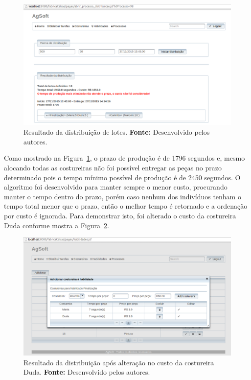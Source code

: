 \begin{figure}[h!]
	\centerline{\includegraphics[scale=0.3]{./imagens/resultado1_teste6.png}}
	\caption[Resultado da distribuição de lotes.] 
	{Resultado da distribuição de lotes. \textbf{Fonte:} Desenvolvido pelos
	autores.}
	\label{fig:resultado1_teste6}
\end{figure}

\par Como mostrado na Figura~\ref{fig:resultado1_teste6}, o prazo de produção
é de 1796 segundos e, mesmo alocando todas as costureiras não foi possível
entregar as peças no prazo determinado pois o tempo mínimo possível de produção
é de 2450 segundos. O algoritmo foi desenvolvido para manter sempre o menor custo, procurando manter o tempo
dentro do prazo, porém caso nenhum dos indivíduos tenham o tempo total menor que o prazo,
então o melhor tempo é retornado e a ordenação por custo é ignorada. Para
demonstrar isto, foi alterado o custo da costureira Duda conforme mostra a Figura~\ref{fig:alterecao_custotcseis}.
 

\begin{figure}[h!]
	\centerline{\includegraphics[scale=0.3]{./imagens/alterecao_custo_teste6.png}}
	\caption[Alteração no custo das costureiras da habilidade Finalização.] 
	{Resultado da distribuição após alteração no custo da costureira Duda. \textbf{Fonte:} Desenvolvido pelos
		autores.}
	\label{fig:alterecao_custotcseis}
\end{figure}

